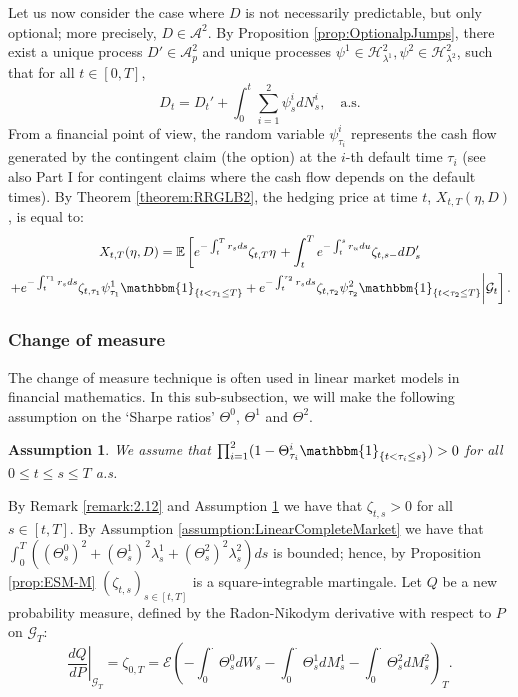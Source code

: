 \documentclass[11pt,a4paper]{article}
\numberwithin{equation}{section}
\theoremstyle{newPlain}
\theoremstyle{newDefinition}
\newtheorem{assumption}{Assumption}[theorem]
\theoremstyle{newRemark}
\begin{document}
Let us now consider the case where $D$ is not necessarily predictable, but only optional; more precisely,  $D\in\mathcal{A}^2$. By Proposition \ref{prop:OptionalpJumps}, there exist a unique process $D'\in\mathcal{A}_p^2$ and unique processes $\psi^1\in\mathcal{H}_{\lambda^1}^2,\psi^2\in\mathcal{H}_{\lambda^2}^2$, such that for all $t\in[0,T]$,
\begin{equation}\label{eq:3_DividendProcess}
    D_t = D_t' + \int_0^t\sum_{i=1}^2\psi_s^idN_s^i,\quad\text{a.s.}
\end{equation}
From a financial point of view, the random variable $\psi_{\tau_i}^i$ represents the cash flow generated by the contingent claim (the option) at the $i$-th default time $\tau_i$ (see also \cite{bielecki2004hedging} Part I for contingent claims where the cash flow depends on the default times). By Theorem \ref{theorem:RRGLB2}, the hedging price at time $t$, $X_{t,T}(\eta,D)$, is equal to:
\begin{multline}\label{eq:3_RepresentationP2}
    X_{t,T}(\eta,D) = \mathbb{E}\left[e^{-\int_t^Tr_sds}\zeta_{t,T}\eta \right.+ \int_t^Te^{-\int_t^sr_udu}\zeta_{t,s-}dD_s'\\\left.+e^{-\int_t^{\tau_1}r_sds}\zeta_{t,\tau_1}\psi_{\tau_1}^1\mathbbm{1}_{\{t<\tau_1\le T\}}+e^{-\int_t^{\tau_2}r_sds}\zeta_{t,\tau_2}\psi_{\tau_2}^2\mathbbm{1}_{\{t<\tau_2\le T\}}\middle|\mathcal{G}_t\right].
\end{multline}

\subsubsection{Change of measure}
The change of measure technique is often used in linear market models in financial mathematics. In this sub-subsection, we will make the following assumption on the `Sharpe ratios' $\Theta^0$, $\Theta^1$ and $\Theta^2$.

\begin{assumption}\label{assumption:PriceOfRiskProduct}
	We assume that $\prod_{i=1}^2(1 - \Theta_{\tau_i}^i\mathbbm{1}_{\{t<\tau_i\le s\}})>0$ for all $0\le t\le s\le T$ a.s.
\end{assumption}
By Remark \ref{remark:2.12} and Assumption \ref{assumption:PriceOfRiskProduct} we have that $\zeta_{t,s}>0$ for all $s\in[t,T]$. By Assumption \ref{assumption:LinearCompleteMarket} we have that $\int_0^T((\Theta_s^0)^2 + (\Theta_s^1)^2\lambda_s^1 + (\Theta_s^2)^2\lambda_s^2)ds$ is bounded; hence, by Proposition \ref{prop:ESM-M} $(\zeta_{t,s})_{s\in[t,T]}$ is a square-integrable martingale. Let $Q$ be a new probability measure, defined by the Radon-Nikodym derivative with respect to $P$ on $\mathcal{G}_T$:
\begin{equation}\label{eq:3_RNd}
    \left.\frac{dQ}{dP}\right|_{\mathcal{G}_T} = \zeta_{0,T} = \mathcal{E}\left(-\int_0^\cdot\Theta_s^0dW_s - \int_0^\cdot\Theta_s^1dM_s^1 - \int_0^\cdot\Theta_s^2dM_s^2\right)_T.
\end{equation}
\end{document}
